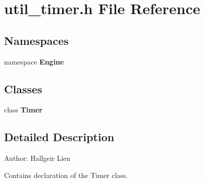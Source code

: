 \section{util\_\-timer.h File Reference}
\label{util__timer_8h}
\subsection*{Namespaces}
\begin{CompactItemize}
\item 
namespace {\bf Engine}
\end{CompactItemize}
\subsection*{Classes}
\begin{CompactItemize}
\item 
class {\bf Timer}
\end{CompactItemize}


\subsection{Detailed Description}
\begin{Desc}
\item[Author:]Hallgeir Lien\end{Desc}
Contains declaration of the Timer class. 